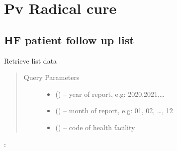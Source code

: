 \documentclass[letterpaper,10pt,english,openany,oneside]{sphinxmanual}
\begin{document}
\begin{fulllineitems}
\end{fulllineitems}



\section{Pv Radical cure}
\label{\detokenize{api/v4:pv-radical-cure}}

\subsection{HF patient follow up list}
\label{\detokenize{api/v4:hf-patient-follow-up-list}}

\begin{fulllineitems}
\label{\detokenize{api/v4:get--api4-HFFollowup-list}}
\sphinxAtStartPar
Retrieve list data
\begin{quote}\begin{description}
\item[{Query Parameters}] \leavevmode\begin{itemize}
\item {} 
\sphinxAtStartPar
{} () – year of report, e.g: 2020,2021,…

\item {} 
\sphinxAtStartPar
{} () – month of report, e.g: 01, 02, …, 12

\item {} 
\sphinxAtStartPar
{} () – code of health facility

\end{itemize}

\end{description}\end{quote}

\sphinxAtStartPar
{}:


\end{fulllineitems}
\end{document}
